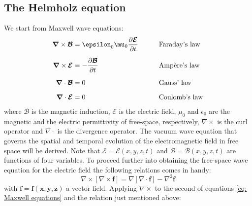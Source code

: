 \documentclass{iucr}              %
\begin{document}
\subsection{The Helmholz equation}

We start from Maxwell wave equations:
\begin{equation}
\label{eq: Maxwell equations}
\begin{aligned}
\bm{\nabla} \times \bm{\mathcal{B}} &=\epsilon_0 \mu_0 \frac{\partial \bm{\mathcal{E}}}{\partial t}
&\qquad &\text{Faraday's law}\\[2\jot]
\bm{\nabla} \times \bm{\mathcal{E}} &= -\frac{\partial \bm{\mathcal{B}}}{\partial t}
&\qquad &\text{Amp\`{e}re's law}\\[2\jot]
\bm{\nabla} \cdot \bm{\mathcal{B}}    &= 0 & \qquad &\text{Gauss' law}\\[2\jot]
\bm{\nabla} \cdot \bm{\mathcal{E}}    &= 0 & \qquad &\text{Coulomb's law}
\end{aligned}
\end{equation}
where $\mathcal{B}$ is the magnetic induction, $\mathcal{E}$ is the electric field, $\mu_0$ and $\epsilon_0$ are the magnetic and the electric permittivity of free-space, respectively, $\nabla \times$ is the curl operator and $\nabla \cdot$ is the divergence operator. The vacuum wave equation that governs the spatial and temporal evolution of the electromagnetic field in free space will be derived. Note that $\mathcal{E}=\mathcal{E}(x,y,z,t)$ and $\mathcal{B}=\mathcal{B}(x,y,z,t)$ are functions of four variables. To proceed further into obtaining the free-space wave equation for the electric field the following relations comes in handy:
\begin{equation}\label{eq: vectorial identity}
	\nabla \times [\nabla \times \bm{f}] = \nabla[\nabla \cdot \bm{f}]-\nabla^2\bm{f}
\end{equation}
with $\bm{f}=\bm{f(x,y,z)}$ a vector field. Applying $\nabla \times$ to the second of equations \ref{eq: Maxwell equations} and the relation just mentioned above:
\end{document}
